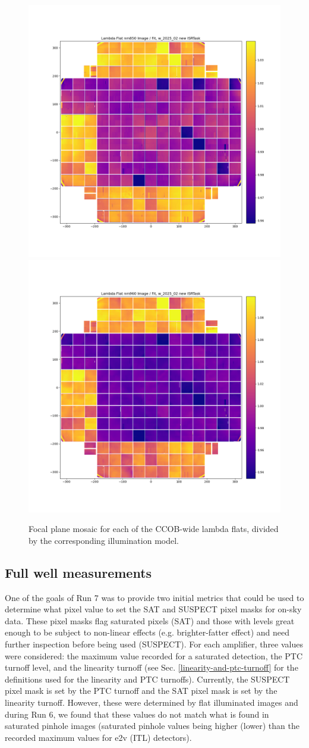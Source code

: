 \begin{figure}[ht]
    \includegraphics[width=0.4\linewidth]{figures/lambda_nm850_E2233.png}
    \includegraphics[width=0.4\linewidth]{figures/lambda_nm960_E2233.png} \\
    \caption{Focal plane mosaic for each of the CCOB-wide lambda flats, divided by the corresponding illumination model.}
    \label{fig:mosaic-relativeqe}
\end{figure}

\clearpage

\clearpage
\subsection{Full well measurements}\label{sec:bfullwellmeasurement}

One of the goals of Run 7 was to provide two initial metrics that could be used to determine what pixel value to set the SAT and SUSPECT pixel masks for on-sky data. These pixel masks flag saturated pixels (SAT) and those with levels great enough to be subject to non-linear effects (e.g. brighter-fatter effect) and need further inspection before being used (SUSPECT). For each amplifier, three values were considered: the maximum value recorded for a saturated detection, the PTC turnoff level, and the linearity turnoff (see Sec. \ref{linearity-and-ptc-turnoff} for the definitions used for the linearity and PTC turnoffs). Currently, the SUSPECT pixel mask is set by the PTC turnoff and the SAT pixel mask is set by the linearity turnoff. However, these were determined by flat illuminated images and during Run 6, we found that these values do not match what is found in saturated pinhole images (saturated pinhole values being higher (lower) than the recorded maximum values for e2v (ITL) detectors).

